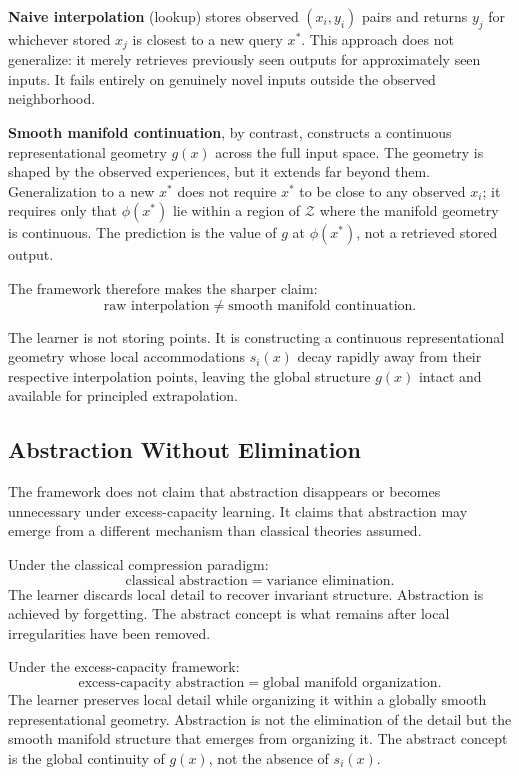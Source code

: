 \documentclass[12pt,a4paper]{article}
\begin{document}
\textbf{Naive interpolation} (lookup) stores observed $(x_i, y_i)$ pairs and returns $y_j$ for whichever stored $x_j$ is closest to a new query $x^*$. This approach does not generalize: it merely retrieves previously seen outputs for approximately seen inputs. It fails entirely on genuinely novel inputs outside the observed neighborhood.

\textbf{Smooth manifold continuation}, by contrast, constructs a continuous representational geometry $g(x)$ across the full input space. The geometry is shaped by the observed experiences, but it extends far beyond them. Generalization to a new $x^*$ does not require $x^*$ to be close to any observed $x_i$; it requires only that $\phi(x^*)$ lie within a region of $\mathcal{Z}$ where the manifold geometry is continuous. The prediction is the value of $g$ at $\phi(x^*)$, not a retrieved stored output.

The framework therefore makes the sharper claim:
\[
\text{raw interpolation} \neq \text{smooth manifold continuation}.
\]

The learner is not storing points. It is constructing a continuous representational geometry whose local accommodations $s_i(x)$ decay rapidly away from their respective interpolation points, leaving the global structure $g(x)$ intact and available for principled extrapolation.

\subsection{Abstraction Without Elimination}

The framework does not claim that abstraction disappears or becomes unnecessary under excess-capacity learning. It claims that abstraction may emerge from a different mechanism than classical theories assumed.

Under the classical compression paradigm:
\[
\text{classical abstraction} = \text{variance elimination}.
\]
The learner discards local detail to recover invariant structure. Abstraction is achieved by forgetting. The abstract concept is what remains after local irregularities have been removed.

Under the excess-capacity framework:
\[
\text{excess-capacity abstraction} = \text{global manifold organization}.
\]
The learner preserves local detail while organizing it within a globally smooth representational geometry. Abstraction is not the elimination of the detail but the smooth manifold structure that emerges from organizing it. The abstract concept is the global continuity of $g(x)$, not the absence of $s_i(x)$.
\end{document}
